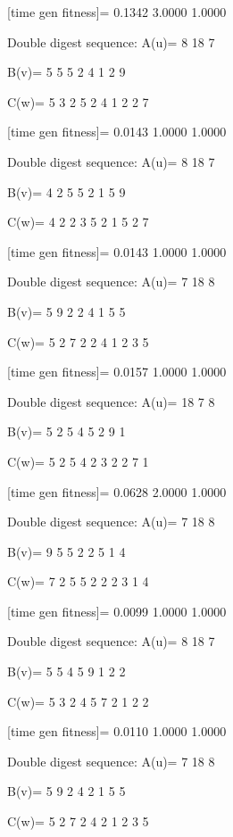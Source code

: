 [time gen fitness]=
    0.1342    3.0000    1.0000

Double digest sequence:
A(u)=
     8    18     7

B(v)=
     5     5     5     2     4     1     2     9

C(w)=
     5     3     2     5     2     4     1     2     2     7

[time gen fitness]=
    0.0143    1.0000    1.0000

Double digest sequence:
A(u)=
     8    18     7

B(v)=
     4     2     5     5     2     1     5     9

C(w)=
     4     2     2     3     5     2     1     5     2     7

[time gen fitness]=
    0.0143    1.0000    1.0000

Double digest sequence:
A(u)=
     7    18     8

B(v)=
     5     9     2     2     4     1     5     5

C(w)=
     5     2     7     2     2     4     1     2     3     5

[time gen fitness]=
    0.0157    1.0000    1.0000

Double digest sequence:
A(u)=
    18     7     8

B(v)=
     5     2     5     4     5     2     9     1

C(w)=
     5     2     5     4     2     3     2     2     7     1

[time gen fitness]=
    0.0628    2.0000    1.0000

Double digest sequence:
A(u)=
     7    18     8

B(v)=
     9     5     5     2     2     5     1     4

C(w)=
     7     2     5     5     2     2     2     3     1     4

[time gen fitness]=
    0.0099    1.0000    1.0000

Double digest sequence:
A(u)=
     8    18     7

B(v)=
     5     5     4     5     9     1     2     2

C(w)=
     5     3     2     4     5     7     2     1     2     2

[time gen fitness]=
    0.0110    1.0000    1.0000

Double digest sequence:
A(u)=
     7    18     8

B(v)=
     5     9     2     4     2     1     5     5

C(w)=
     5     2     7     2     4     2     1     2     3     5

